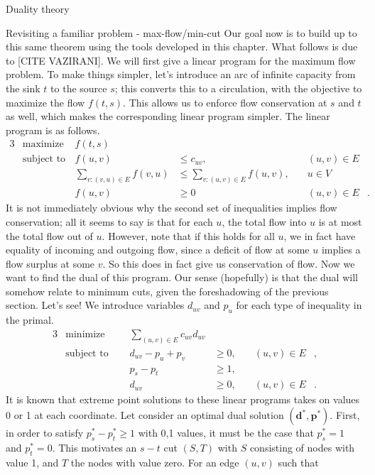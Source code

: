 \begin{section}{Duality theory}
\begin{subsection}{Revisiting a familiar problem - max-flow/min-cut}
	Our goal now is to build up to this same theorem using the tools developed in this chapter. 
	What follows is due to [CITE VAZIRANI]. We will first give a linear program for the 
	maximum flow problem. To make things simpler, let's introduce an arc of infinite capacity 
	from the sink $t$ to the source $s$; this converts this to a circulation, with the objective to 
	maximize the flow $f(t,s)$. This allows us to enforce flow conservation at $s$ and $t$ as well, 
	which makes the corresponding linear program simpler. The linear program is as follows.
	\begin{alignat*}{3}
		& \text{maximize } & f(t,s)\\
		& \text{subject to } & f(u,v) &\leq c_{uv}, &\quad (u,v)\in E\\ 
				     && \sum_{v:(v,u)\in E} f(v,u) & \leq \sum_{v:(u,v)\in E} f(u,v), &
				     	\quad u\in V &\\
				     && f(u,v) &\geq 0 &\quad (u,v)\in E &.
	\end{alignat*}
	It is not immediately obvious why the second set of inequalities implies flow conservation; all 
	it seems to say is that for each $u$, the total flow into $u$ is at most the total flow out 
	of $u$. However, note that if this holds for all $u$, we in fact have equality of incoming and 
	outgoing flow, since a deficit of flow at some $u$ implies a flow surplus at some $v$. So 
	this does in fact give us conservation of flow. Now we want to find the dual of this program. 
	Our sense (hopefully) is that the dual will somehow relate to minimum cuts, given the 
	foreshadowing of the previous section. Let's see! We introduce variables $d_{uv}$ and $p_u$ for 
	each type of inequality in the primal.
	\begin{alignat*}{3}
		& \text{minimize } & \sum_{(u,v)\in E} c_{uv} d_{uv}& \\
		& \text{subject to } \quad & d_{uv} - p_u + p_v & \geq 0, & \quad (u,v)\in E &, \\
				    && p_s - p_t & \geq 1, & \\
				    && d_{uv} & \geq 0, & \quad (u,v) \in E &.
	\end{alignat*}
	It is known that extreme point solutions to these linear programs takes on values 0 or 1 at 
	each coordinate. Let consider an optimal dual solution $(\mathbf{d}^{*},\mathbf{p}^{*})$. 
	First, in order to satisfy $p_s^{*} - p_{t}^{*} \geq 1$ with 0,1 values, it must be the case 
	that $p_s^{*} = 1$ and $p_t^{*} = 0$. This motivates an $s-t$ cut $(S,T)$ with $S$ consisting 
	of nodes with value 1, and $T$ the nodes with value zero. For an edge $(u,v)$ such that 

\end{subsection}
\end{section}
